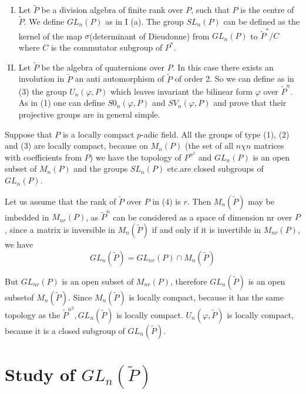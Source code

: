 \begin{enumerate}[(I)]
  $\widetilde{P}$. If $\varphi$ is a non-degenerate
  Hermitian\pageoriginale bilinear 
  form over $E$ \iec  $\varphi(y,x)= \varphi \overline{(x,y)}$, then
  the set $U_n(\varphi,P)$ of elements of $G L_n(P)$ leaving $\varphi$
  invariant is a group called the unitary group. 
\item Let $\widetilde{P}$ be a division algebra of finite rank
  over $P$, such that $P$ is the centre of $\widetilde{P}$. We define
  $G L_n(P)$ as in I (a). The group $S L_n(P)$ can be defined as the
  kernel of the map $\sigma$(determinant of Dieudonne) from $G L_n(P)$
  to $\widetilde{P}^*/C$ where $C$ is the commutator subgroup of
  $P^*$. 
\item Let $\widetilde{P}$ be the algebra of quaternions over $P$. In
  this case there exists an involution in $\widetilde{P}$ \iec  an
  anti automorphism of $\widetilde{P}$ of order 2. So we can define as
  in (3) the group $U_n(\varphi, P)$ which leaves invariant the
  bilinear form $\varphi$ over $\widetilde{P}^n$. As in (1) one can
  define $S 0_n(\varphi,  P)$ and $S V_n(\varphi,  P)$ and prove that
  their projective groups are in general simple. 
\end{enumerate}

Suppose that $P$ is a locally compact $p$-adic field. All the groups of
type (1), (2) and (3) are locally compact, because on
$M_n(P)$ (the set of all $n \chi n$ matrices with coefficients from $P$)
we have the topology of $P^{n^2}$ and $G L_n (P)$ is an open subset of
$M_n(P)$ and the groups $S L_n(P)$ etc.are closed subgroups of $G L_n
(P)$. 

Let us assume that the rank of $\widetilde{P}$ over $P$ in ($4$) is
$r$. Then $M_n(\widetilde{P})$ may be imbedded in $M_{nr}(P)$, as
$\widetilde{P}^n$ can be considered as a space of dimension nr over
$P$, since a matrix is inversible in $M_n(\widetilde{P})$ if and only
if it is invertible in $M_{nr}(P)$, we have 
$$
G L_n(\widetilde{P}) = G L_{nr}(P) \cap M_n(\widetilde{P})
$$

But $G L_{nr}(P)$ is an open subset of $M_{nr}(P)$, therefore $G
L_n(\widetilde{P})$ is an open subset\pageoriginale of $M_n(\widetilde{P})$. Since
$M_n(\widetilde{P})$ is locally compact, because it has the same
topology as the $\widetilde{P}^{n^2},G L_n(\widetilde{P})$ is locally
compact. $U_n(\varphi, \widetilde{P})$ is locally compact,
because it is a closed subgroup of $G L_n(\widetilde{P})$. 

\section {Study of $G L_n(\widetilde{P})$}\label{part2:chap2:sec2}

